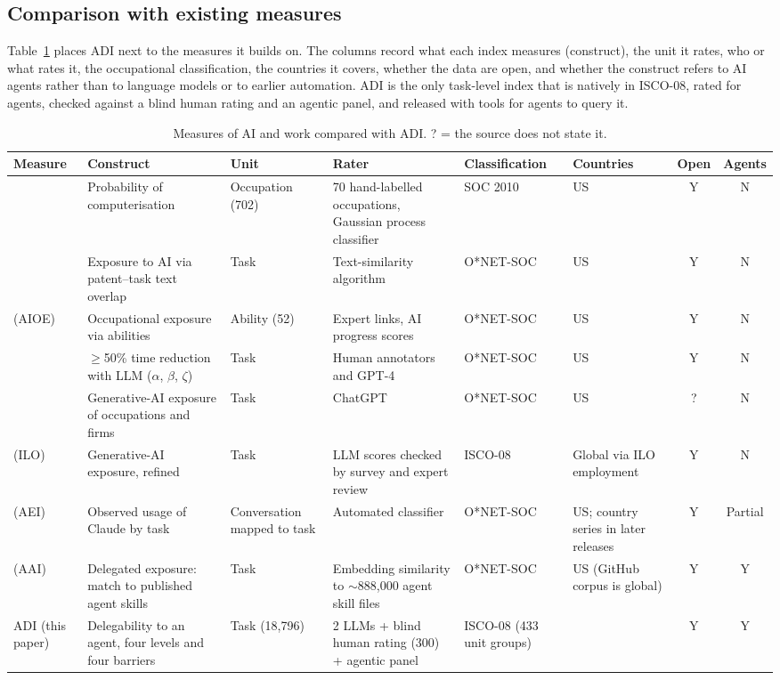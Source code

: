 \documentclass[preprint,12pt,authoryear]{elsarticle}
\makeatletter
\providecommand{\cifra}{}\providecommand{\cifraopc}{}\providecommand{\cifraabs}{}\providecommand{\pval}{}
\renewcommand{\cifra}[1]{\@ifundefined{cf@#1}{\textbf{??\detokenize{#1}}}{\@nameuse{cf@#1}}}
\renewcommand{\cifraopc}[1]{\@ifundefined{cf@#1}{--}{\@nameuse{cf@#1}}}
\renewcommand{\cifraabs}[1]{\@ifundefined{cfa@#1}{\textbf{??\detokenize{#1}}}{\@nameuse{cfa@#1}}}
\renewcommand{\pval}[1]{\@ifundefined{cfp@#1}{\textbf{??\detokenize{#1}}}{\@nameuse{cfp@#1}}}
\makeatother
\begin{document}
\subsection{Comparison with existing measures}

Table~\ref{tab:comparativa} places ADI next to the measures it builds on.
The columns record what each index measures (construct), the unit it rates, who or what rates it, the occupational classification, the countries it covers, whether the data are open, and whether the construct refers to AI agents rather than to language models or to earlier automation.
ADI is the only task-level index that is natively in ISCO-08, rated for agents, checked against a blind human rating and an agentic panel, and released with tools for agents to query it.

\begin{table}[t]
  \centering
  \footnotesize
  \setlength{\tabcolsep}{3pt}
  \caption{Measures of AI and work compared with ADI. ? = the source does not state it.}
  \label{tab:comparativa}
  \begin{tabular}{@{}p{2.6cm}p{2.5cm}p{1.8cm}p{2.2cm}p{1.9cm}p{1.3cm}cc@{}}
    \toprule
    Measure & Construct & Unit & Rater & Classification & Countries & Open & Agents \\
    \midrule
    \citet{frey2017future} & Probability of computerisation & Occupation (702) & 70 hand-labelled occupations, Gaussian process classifier & SOC 2010 & US & Y & N \\
    \citet{webb2020impact} & Exposure to AI via patent--task text overlap & Task & Text-similarity algorithm & O*NET-SOC & US & Y & N \\
    \citet{felten2021occupational} (AIOE) & Occupational exposure via abilities & Ability (52) & Expert links, AI progress scores & O*NET-SOC & US & Y & N \\
    \citet{eloundou2024gpts} & $\geq$50\% time reduction with LLM ($\alpha$, $\beta$, $\zeta$) & Task & Human annotators and GPT-4 & O*NET-SOC & US & Y & N \\
    \citet{eisfeldt2023generative} & Generative-AI exposure of occupations and firms & Task & ChatGPT & O*NET-SOC & US & ? & N \\
    \citet{gmyrek2025generative} (ILO) & Generative-AI exposure, refined & Task & LLM scores checked by survey and expert review & ISCO-08 & Global via ILO employment & Y & N \\
    \citet{aei2025economic} (AEI) & Observed usage of Claude by task & Conversation mapped to task & Automated classifier & O*NET-SOC & US; country series in later releases & Y & Partial \\
    \citet{lee2026delegates} (AAI) & Delegated exposure: match to published agent skills & Task & Embedding similarity to $\sim$888,000 agent skill files & O*NET-SOC & US (GitHub corpus is global) & Y & Y \\
    ADI (this paper) & Delegability to an agent, four levels and four barriers & Task (18,796) & 2 LLMs + blind human rating (300) + agentic panel & ISCO-08 (433 unit groups) & \cifra{diseno.atlas.paises} & Y & Y \\
    \bottomrule
  \end{tabular}
\end{table}
\end{document}
